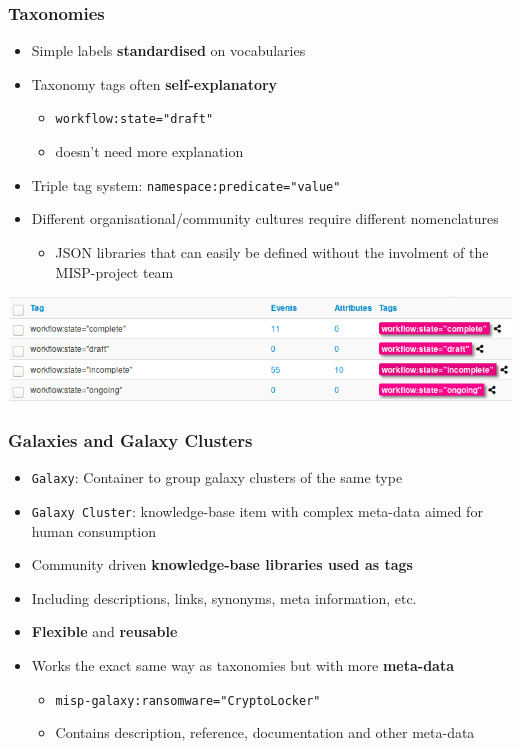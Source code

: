 \begin{frame}
    \frametitle{Taxonomies}
    \begin{itemize}
        \item Simple labels \textbf{standardised} on vocabularies
        \item Taxonomy tags often {\bf self-explanatory}
        \begin{itemize}
            \item \texttt{workflow:state="draft"}
            \item doesn't need more explanation
        \end{itemize}
        \item Triple tag system: \texttt{namespace:predicate="value"}
        \item Different organisational/community cultures require different nomenclatures
        \begin{itemize}
            \item JSON libraries that can easily be defined without the involment of the MISP-project team
        \end{itemize}
    \end{itemize}
    \includegraphics[width=1.0\linewidth]{pictures/taxonomy-workflow.png}
\end{frame}

\begin{frame}
    \frametitle{Galaxies and Galaxy Clusters}
    \begin{itemize}
        \item \texttt{Galaxy}: Container to group galaxy clusters of the same type
        \item \texttt{Galaxy Cluster}: knowledge-base item with complex meta-data aimed for human consumption
    \end{itemize}
    \vspace{12px}
    \begin{itemize}
        \item Community driven \textbf{knowledge-base libraries used as tags}
        \item Including descriptions, links, synonyms, meta information, etc. 
        \item \textbf{Flexible} and \textbf{reusable}
        \item Works the exact same way as taxonomies but with more \textbf{meta-data}
        \begin{itemize}
            \item \texttt{misp-galaxy:ransomware="CryptoLocker"}
            \item Contains description, reference, documentation and other meta-data
        \end{itemize}
    \end{itemize}
\end{frame}

